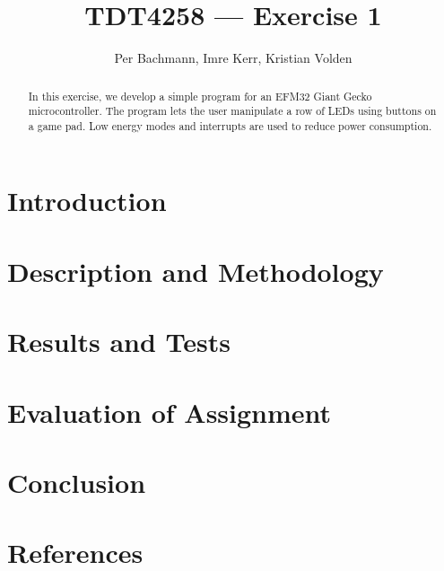 \documentclass[a4paper, 12pt]{article}
\title{TDT4258 --- Exercise 1}
\author{Per Bachmann, Imre Kerr, Kristian Volden}
\begin{document}
\maketitle
\begin{abstract}
In this exercise, we develop a simple program for an EFM32 Giant Gecko microcontroller. The program lets the user manipulate a row of LEDs using buttons on a game pad. Low energy modes and interrupts are used to reduce power consumption.
\end{abstract}
\section{Introduction} %
\label{sec:introduction}


\section{Description and Methodology} %
\label{sec:description_and_methodology}


\section{Results and Tests} %
\label{sec:results_and_tests}


\section{Evaluation of Assignment} %
\label{sec:evaluation_of_assignment}


\section{Conclusion} %
\label{sec:conclusion}


\section{References} %
\label{sec:references}

\end{document}
